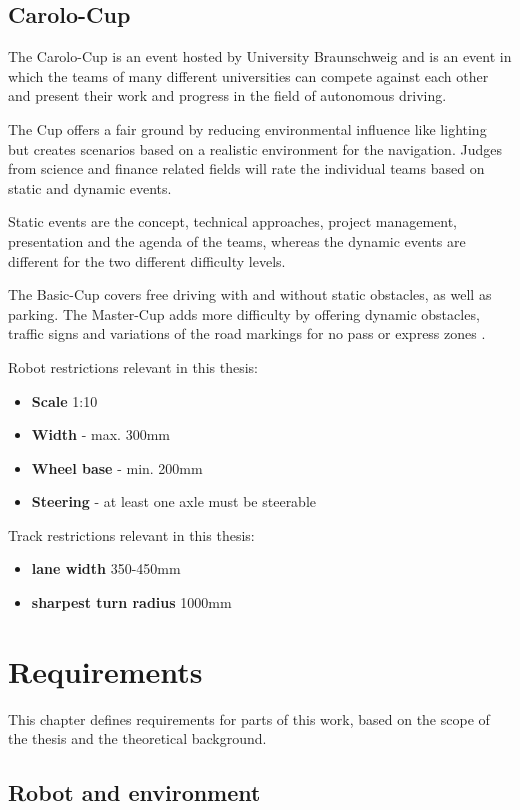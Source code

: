 \section{Carolo-Cup}
The Carolo-Cup is an event hosted by University Braunschweig and is an event in which the teams of many different universities can compete against each other and present their work and progress in the field of autonomous driving.

The Cup offers a fair ground by reducing environmental influence like lighting but creates scenarios based on a realistic environment for the navigation. Judges from science and finance related fields will rate the individual teams based on static and dynamic events.

Static events are the concept, technical approaches, project management, presentation and the agenda of the teams, whereas the dynamic events are different for the two different difficulty levels.

The Basic-Cup covers free driving with and without static obstacles, as well as parking. The Master-Cup adds more difficulty by offering dynamic obstacles, traffic signs and variations of the road markings for no pass or express zones\cite{carolocup} \cite{vdecarolo}.

Robot restrictions relevant in this thesis:
\begin{itemize}
	\item \textbf{Scale} 1:10
	\item \textbf{Width} - max. 300mm
	\item \textbf{Wheel base} - min. 200mm
	\item \textbf{Steering} - at least one axle must be steerable
\end{itemize}

Track restrictions relevant in this thesis:
\begin{itemize}
	\item \textbf{lane width} 350-450mm
	\item \textbf{sharpest turn radius} 1000mm
\end{itemize}

\chapter{Requirements}
\label{requirements}

This chapter defines requirements for parts of this work, based on the scope of the thesis and the theoretical background.

\section{Robot and environment}


